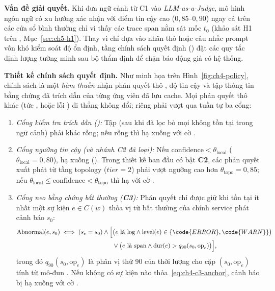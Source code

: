 \textbf{Vấn đề giải quyết.} Khi đưa ngữ cảnh từ C1 vào \emph{LLM-as-a-Judge}, mô hình ngôn ngữ có xu hướng xác nhận  với điểm tin cậy cao ($0{,}85$--$0{,}90$) ngay cả trên các cửa sổ bình thường chỉ vì thấy các trace span nằm sát mốc $t_0$ (khảo sát H1 trên , Mục~\ref{sec:ch5-h1}). Thay vì chỉ dựa vào nhãn thô hoặc câu nhắc prompt vốn khó kiểm soát độ ổn định, tầng chính sách quyết định () đặt các quy tắc định lượng tường minh sau bộ thẩm định để chặn báo động giả có hệ thống.

\textbf{Thiết kế chính sách quyết định.} Như minh họa trên Hình~\ref{fig:ch4-policy}, chính sách là một \emph{hàm thuần} nhận phán quyết thô , độ tin cậy  và tập thông tin bằng chứng đã trích dẫn  của từng ứng viên đã lưu cache. Mọi phán quyết thô khác  (tức ,  hoặc lỗi ) đi thẳng không đổi; riêng  phải vượt qua tuần tự ba cổng:
\begin{enumerate}
  \item \emph{Cổng kiểm tra trích dẫn ():} Tập  (sau khi đã lọc bỏ mọi  không tồn tại trong ngữ cảnh) phải khác rỗng; nếu rỗng thì hạ xuống  với cờ .
  \item \emph{Cổng ngưỡng tin cậy (và nhánh C2 đã loại):} Nếu $\text{confidence} < \theta_{\text{local}}$ ($\theta_{\text{local}} = 0{,}80$), hạ xuống  (). Trong thiết kế ban đầu có bật \textbf{C2}, các phán quyết xuất phát từ tầng topology ($tier = 2$) phải vượt ngưỡng cao hơn $\theta_{\text{topo}} = 0{,}85$; nếu $\theta_{\text{local}} \le \text{confidence} < \theta_{\text{topo}}$ thì hạ với cờ .
  \item \emph{Cổng neo bằng chứng bất thường (\textbf{C3}):} Phán quyết  chỉ được giữ khi tồn tại ít nhất một sự kiện $e \in C(w)$ thỏa vị từ bất thường của chính service phát cảnh báo $s_0$:
  \begin{equation}
    \begin{aligned}
      \text{Abnormal}(e, s_0) \iff (s_e = s_0) \land \Big[
        &\big(e \text{ là log} \land \text{level}(e) \in \{\code{ERROR}, \code{WARN}\}\big) \\
        &\lor \big(e \text{ là span} \land \text{dur}(e) > q_{90}(s_0, \text{op}_e)\big)
      \Big],
    \end{aligned}
    \label{eq:ch4-c3-anchor}
  \end{equation}
  trong đó $q_{90}(s_0, \text{op}_e)$ là phân vị thứ 90 của thời lượng  cho cặp $(s_0, \text{op}_e)$ tính từ mô-đun . Nếu không có sự kiện nào thỏa~\eqref{eq:ch4-c3-anchor}, cảnh báo bị hạ xuống  với cờ .
\end{enumerate}

